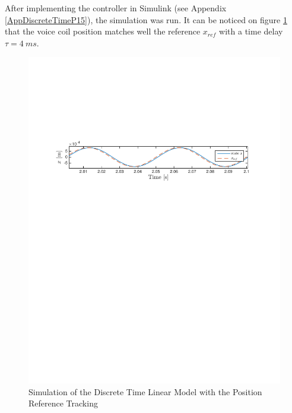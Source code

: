 After implementing the controller in Simulink (see Appendix \ref{AppDiscreteTimeP15}), the simulation was run. It can be noticed on figure \ref{fig:P15xref} that the voice coil position matches well the reference $x_{ref}$ with a time delay $\tau = 4 \ ms$.
\begin{figure}[H]
 \centering 
 \includegraphics[trim=2cm 17cm 2cm 7cm, clip=true, totalheight=0.12\textheight, angle=0]{figures/P15xref.pdf}
 \caption{Simulation of the Discrete Time Linear Model with the Position Reference Tracking}
 \label{fig:P15xref}
\end{figure}